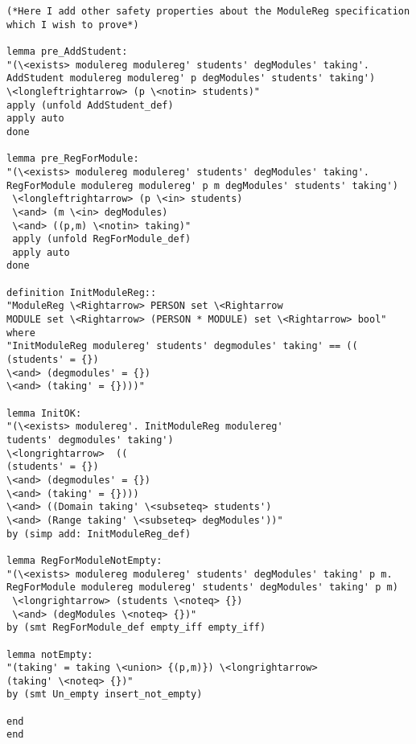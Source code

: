 \begin{scriptsize}
\begin{verbatim}
(*Here I add other safety properties about the ModuleReg specification 
which I wish to prove*)

lemma pre_AddStudent:
"(\<exists> modulereg modulereg' students' degModules' taking'.
AddStudent modulereg modulereg' p degModules' students' taking')
\<longleftrightarrow> (p \<notin> students)"
apply (unfold AddStudent_def)
apply auto
done

lemma pre_RegForModule:
"(\<exists> modulereg modulereg' students' degModules' taking'.
RegForModule modulereg modulereg' p m degModules' students' taking')
 \<longleftrightarrow> (p \<in> students)
 \<and> (m \<in> degModules)
 \<and> ((p,m) \<notin> taking)"
 apply (unfold RegForModule_def)
 apply auto
done

definition InitModuleReg::
"ModuleReg \<Rightarrow> PERSON set \<Rightarrow
MODULE set \<Rightarrow> (PERSON * MODULE) set \<Rightarrow> bool"
where
"InitModuleReg modulereg' students' degmodules' taking' == ((
(students' = {})
\<and> (degmodules' = {})
\<and> (taking' = {})))"

lemma InitOK:
"(\<exists> modulereg'. InitModuleReg modulereg' 
tudents' degmodules' taking')
\<longrightarrow>  ((
(students' = {})
\<and> (degmodules' = {})
\<and> (taking' = {})))
\<and> ((Domain taking' \<subseteq> students')
\<and> (Range taking' \<subseteq> degModules'))"
by (simp add: InitModuleReg_def)

lemma RegForModuleNotEmpty:
"(\<exists> modulereg modulereg' students' degModules' taking' p m.
RegForModule modulereg modulereg' students' degModules' taking' p m)
 \<longrightarrow> (students \<noteq> {})
 \<and> (degModules \<noteq> {})"
by (smt RegForModule_def empty_iff empty_iff)

lemma notEmpty:
"(taking' = taking \<union> {(p,m)}) \<longrightarrow>
(taking' \<noteq> {})"
by (smt Un_empty insert_not_empty)

end
end
\end{verbatim}
\end{scriptsize}